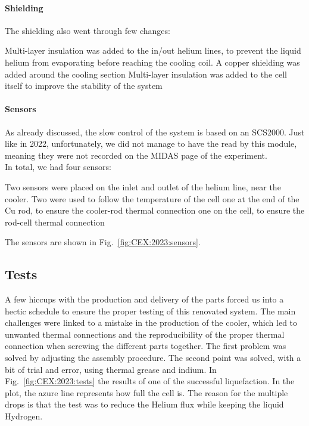 \begin{refsection}
        \paragraph{Shielding} The shielding also went through few changes:
        \begin{outline}
            \1 Multi-layer insulation was added to the in/out helium lines, to prevent the liquid helium from evaporating before reaching the cooling coil.
            \1 A copper shielding was added around the cooling section
            \1 Multi-layer insulation was added to the cell itself to improve the stability of the system 
        \end{outline}

        \paragraph{Sensors} As already discussed, the slow control of the system is based on an SCS2000.
        Just like in 2022, unfortunately, we did not manage to have the \lakeshore read by this module, meaning they were not recorded on the MIDAS page of the experiment.\\
        In total, we had four \lakeshore sensors:
        \begin{outline}
            \1 Two sensors were placed on the inlet and outlet of the helium line, near the cooler.
            \1 Two were used to follow the temperature of the cell
                \2 one at the end of the Cu rod, to ensure the cooler-rod thermal connection
                \2 one on the cell, to ensure the rod-cell thermal connection 
        \end{outline}
        The sensors are shown in Fig.~\ref{fig:CEX:2023:sensors}.

    \subsection{Tests}
        A few hiccups with the production and delivery of the parts forced us into a hectic schedule to ensure the proper testing of this renovated system.
        The main challenges were linked to a mistake in the production of the cooler, which led to unwanted thermal connections and the reproducibility of the proper thermal connection when screwing the different parts together.
        The first problem was solved by adjusting the assembly procedure. The second point was solved, with a bit of trial and error, using thermal grease and indium.
        In Fig.~\ref{fig:CEX:2023:tests} the results of one of the successful liquefaction. 
        In the plot, the azure line represents how full the cell is. 
        The reason for the multiple drops is that the test was to reduce the Helium flux while keeping the liquid Hydrogen.


\end{refsection}
